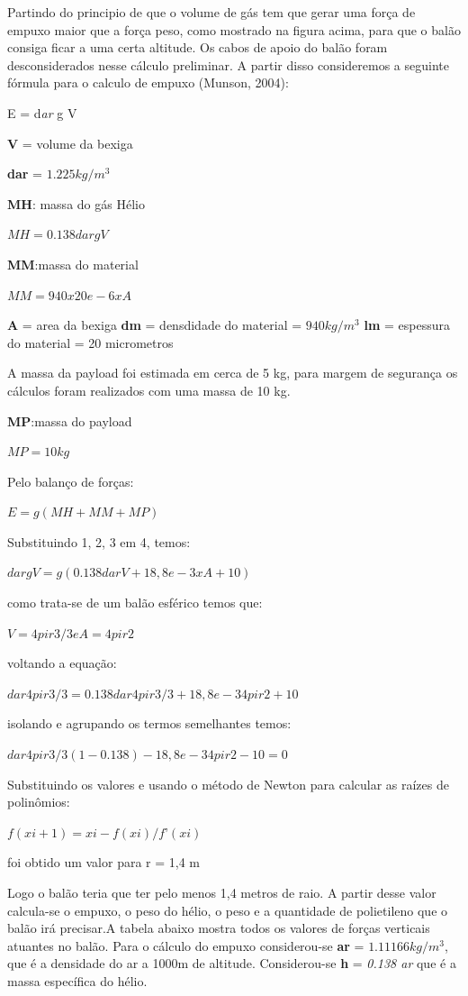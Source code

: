	Partindo do principio de que o volume de gás tem que gerar uma força de empuxo maior que a força peso, como mostrado na figura acima, para que o balão consiga ficar a uma certa altitude. Os cabos de apoio do balão foram desconsiderados nesse cálculo preliminar. A partir disso consideremos a seguinte fórmula para o calculo de empuxo (Munson, 2004):

	E = d\textit{ar} g V


	\textbf{V} = volume da bexiga

	\textbf{dar} = $1.225 kg/m^3$

	\textbf{MH}: massa do gás Hélio

	$MH = 0.138dar g V$

	\textbf{MM}:massa do material

 			$MM = 940 x 20e-6 x A$

	\textbf{A} = area da bexiga
	\textbf{dm} = densdidade do material = $940 kg/m^3$
	\textbf{lm} = espessura do material = 20 micrometros

	A massa da payload foi estimada em cerca de 5 kg, para margem de segurança os cálculos foram realizados com uma massa de 10 kg.

	\textbf{MP}:massa do payload

	$MP =  10kg$

	Pelo balanço de forças:

	$E = g(MH+MM+MP)$

	Substituindo 1, 2, 3 em 4, temos:

	$dar g V = g(0.138dar  V + 18,8e-3 x A + 10)$

	como trata-se de um balão esférico temos que:

	$V = 4pi r3/3 e A = 4pi r2$

	voltando a equação:

	$dar 4pi r3/3 = 0.138dar4pi r3/3 + 18,8e-3 4pi r2 +10$

	isolando e agrupando os termos semelhantes temos:

	$dar 4pi r3/3 (1 - 0.138) - 18,8e-3 4pi r2 -10 = 0$

	Substituindo os valores e usando o método de Newton para calcular as raízes de polinômios:

	$f(xi+1) = xi - f(xi) / f ’ (xi)	$

	foi obtido um valor para r = 1,4 m

	 Logo o balão teria que ter pelo menos 1,4 metros de raio. A partir desse valor calcula-se o empuxo, o peso do hélio, o peso e a quantidade de polietileno que o balão irá precisar.A tabela abaixo mostra todos os valores de forças verticais atuantes no balão. Para o cálculo do empuxo considerou-se \textbf{ar}  = $1.11166 kg/m^3$, que é a densidade do ar a 1000m de altitude. Considerou-se \textbf{h} = \textit{0.138 ar} que é a massa específica do hélio.

